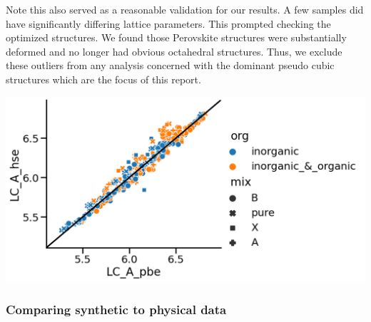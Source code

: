 \documentclass[twoside, twocolumn, 9pt, draft]{article}
\begin{document}
Note this also served as a reasonable validation for our results. A
few samples did have significantly differing lattice parameters. This
prompted checking the optimized structures. We found those Perovskite
structures were substantially deformed and no longer had obvious
octahedral structures. Thus, we exclude these outliers from any
analysis concerned with the dominant pseudo cubic structures which are
the focus of this report.

\begin{center}
\includegraphics[width=.9\linewidth]{pbe_v_hse_LC.png}
\end{center}

\subsubsection*{Comparing synthetic to physical data}
\label{sec:org415c7f5}
\end{document}
